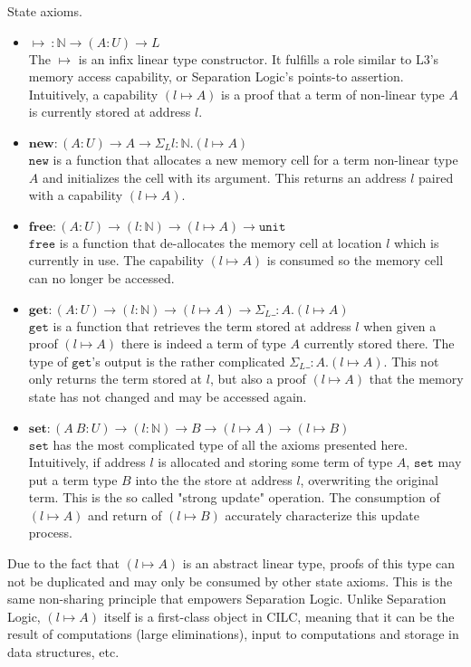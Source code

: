 \documentclass[sigplan,screen,review,anonymous]{acmart}
\newcommand{\unit}{\texttt{unit}}
\newcommand{\new}{\texttt{new}}
\newcommand{\free}{\texttt{free}}
\newcommand{\get}{\texttt{get}}
\newcommand{\set}{\texttt{set}}
\newcommand{\SigmaL}{\Sigma_{\scriptscriptstyle L}}
\begin{document}
\begin{definition}
  State axioms.
  \begin{itemize}
    \item $\mapsto\ : \mathbb{N} \rightarrow (A : U) \rightarrow L$ \\
          The $\mapsto$ is an infix linear type constructor. It fulfills a role similar to L3's \cite{l3} memory access capability, or Separation Logic's \cite{reynolds02} points-to assertion. Intuitively, a capability $(l \mapsto A)$ is a proof that a term of non-linear type $A$ is currently stored at address $l$.
    \item $\textbf{new} : (A : U) \rightarrow A \rightarrow \SigmaL l:\mathbb{N}.(l \mapsto A)$ \\
          $\new$ is a function that allocates a new memory cell for a term non-linear type $A$ and initializes the cell with its argument. This returns an address $l$ paired with a capability $(l \mapsto A)$.
    \item $\textbf{free} : (A : U) \rightarrow (l:\mathbb{N}) \rightarrow (l \mapsto A) \rightarrow \unit$ \\
          $\free$ is a function that de-allocates the memory cell at location $l$ which is currently in use. The capability $(l \mapsto A)$ is consumed so the memory cell can no longer be accessed.
    \item $\textbf{get} : (A : U) \rightarrow (l : \mathbb{N}) \rightarrow (l \mapsto A) \rightarrow \SigmaL \_: A. (l \mapsto A)$ \\
          $\get$ is a function that retrieves the term stored at address $l$ when given a proof $(l \mapsto A)$ there is indeed a term of type $A$ currently stored there. The type of $\get$'s output is the rather complicated $\SigmaL \_: A. (l \mapsto A)$. This not only returns the term stored at $l$, but also a proof $(l \mapsto A)$ that the memory state has not changed and may be accessed again.
    \item $\textbf{set} : (A\ B : U) \rightarrow (l : \mathbb{N}) \rightarrow B \rightarrow (l \mapsto A) \rightarrow (l \mapsto B)$ \\
          $\set$ has the most complicated type of all the axioms presented here. Intuitively, if address $l$ is allocated and storing some term of type $A$, $\set$ may put a term type $B$ into the the store at address $l$, overwriting the original term. This is the so called "strong update" operation. The consumption of $(l \mapsto A)$ and return of $(l \mapsto B)$ accurately characterize this update process.
  \end{itemize}
\end{definition}
Due to the fact that $(l \mapsto A)$ is an abstract linear type, proofs of this type can not be duplicated and may only be consumed by other state axioms. This is the same non-sharing principle that empowers Separation Logic. Unlike Separation Logic, $(l \mapsto A)$ itself is a first-class object in CILC, meaning that it can be the result of computations (large eliminations), input to computations and storage in data structures, etc.
\end{document}
